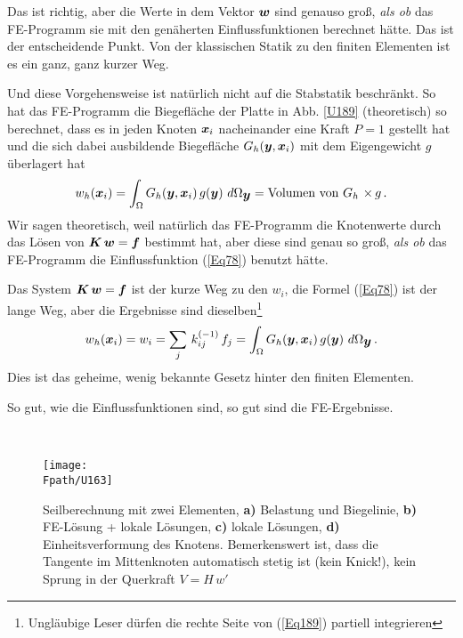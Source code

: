 Das ist richtig, aber die Werte in dem Vektor $\mbox{\boldmath $w$}$ sind genauso gro{\ss}, {\em als ob\/} das FE-Programm sie mit den gen\"{a}herten Einflussfunktionen berechnet h\"{a}tte. Das ist der entscheidende Punkt. Von der klassischen Statik zu den finiten Elementen ist es ein ganz, ganz kurzer Weg.

Und diese Vorgehensweise ist nat\"{u}rlich nicht auf die Stabstatik beschr\"{a}nkt. So hat das FE-Programm die Biegefl\"{a}che der Platte in Abb. \ref{U189} (theoretisch) so berechnet, dass es in jeden Knoten $\mbox{\boldmath $x$}_i$ nacheinander eine Kraft $P = 1$ gestellt hat und die sich dabei ausbildende Biegefl\"{a}che $G_h(\mbox{\boldmath $y$},\mbox{\boldmath $x$}_i)$ mit dem Eigengewicht $g$ \"{u}berlagert hat
\begin{align}\label{Eq78}
w_h(\mbox{\boldmath $x$}_i) = \int_{\Omega} G_h(\mbox{\boldmath $y$}, \mbox{\boldmath $x$}_i)\,g(\mbox{\boldmath $y$})\,\,d\Omega_{\mbox{\boldmath $y$}} = \text{Volumen von $G_h$ $\times\,g$}\,.
\end{align}
Wir sagen theoretisch, weil nat\"{u}rlich das FE-Programm die Knotenwerte durch das L\"{o}sen von $\mbox{\boldmath $K$}\,\mbox{\boldmath $w$} = \mbox{\boldmath $f$}$ bestimmt hat, aber diese sind  genau so gro{\ss}, {\em als ob\/} das FE-Programm die Einflussfunktion (\ref{Eq78}) benutzt h\"{a}tte.

Das System $\mbox{\boldmath $K$}\,\mbox{\boldmath $w$} = \mbox{\boldmath $f$}$ ist der \glq kurze\grq{} Weg zu den $w_i$, die Formel (\ref{Eq78}) ist der \glq lange\grq{} Weg, aber die Ergebnisse sind dieselben\footnote{Ungl\"{a}ubige Leser d\"{u}rfen die rechte Seite von (\ref{Eq189}) partiell integrieren}
\begin{align}\label{Eq189}
w_h(\mbox{\boldmath $x$}_i) = w_i = \sum_j\,k_{ij}^{(-1)}\,f_j = \int_{\Omega} G_h(\mbox{\boldmath $y$}, \mbox{\boldmath $x$}_i)\,g(\mbox{\boldmath $y$})\,\,d\Omega_{\mbox{\boldmath $y$}}\,.
\end{align}
Dies ist das geheime, wenig bekannte Gesetz hinter den finiten Elementen. \\

\hspace*{-12pt}\colorbox{highlightBlue}{\parbox{0.98\textwidth}{So gut, wie die Einflussfunktionen sind, so gut sind die FE-Ergebnisse.}}\\

\begin{figure}[tbp]
\centering
\if {} \sidecaption[t] \fi
\texttt{[image: \\Fpath/U163]}
\caption{Seilberechnung mit zwei Elementen,  \textbf{a)} Belastung und Biegelinie, \textbf{ b)} FE-L\"{o}sung + lokale L\"{o}sungen, \textbf{ c)} lokale L\"{o}sungen, \textbf{ d)} Einheitsverformung des Knotens. Bemerkenswert ist, dass die Tangente im Mittenknoten automatisch stetig ist (kein Knick!), kein Sprung in der Querkraft $V = H\,w'$} \label{U163}
\end{figure}%

